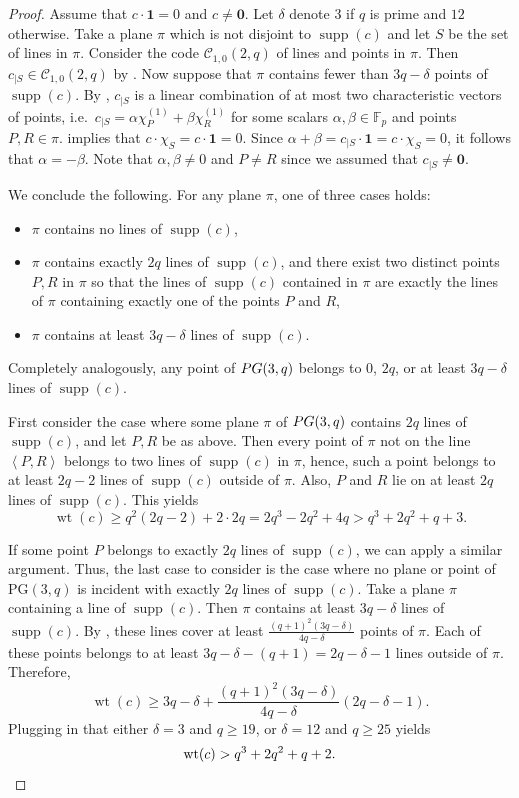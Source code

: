 \documentclass[a4paper]{article}
\theoremstyle{definition}
\newcommand{\FF}{\mathbb F}
\newcommand{\vspan}[1]{\left \langle #1 \right \rangle}
\newcommand{\pg}{\textnormal{PG}}
\newcommand{\one}{\mathbf 1}
\newcommand{\zero}{\mathbf 0}
\newcommand{\mc}{\mathcal C}
\DeclareMathOperator{\supp}{supp}
\DeclareMathOperator{\wt}{wt}
\begin{document}
\begin{proof}
 Assume that $c \cdot \one = 0$ and $c \neq \zero$.
 Let $\delta$ denote $3$ if $q$ is prime and $12$ otherwise.
 Take a plane $\pi$ which is not disjoint to $\supp(c)$ and let $S$ be the set of lines in $\pi$.
 Consider the code $\mc_{1,0}(2,q)$ of lines and points in $\pi$.
 Then $c_{|S} \in \mc_{1,0}(2,q)$ by .
 Now suppose that $\pi$ contains fewer than $3q-\delta$ points of $\supp(c)$.
 By , $c_{|S}$ is a linear combination of at most two characteristic vectors of points, i.e.\ $c_{|S} = \alpha \chi_{P}^{(1)} + \beta \chi_{R}^{(1)}$ for some scalars $\alpha, \beta \in \FF_p$ and points $P, R \in \pi$.
  implies that $c \cdot \chi_S = c \cdot \one = 0$.
 Since $\alpha + \beta = c_{|S} \cdot \one = c \cdot \chi_S = 0$, it follows that $\alpha = -\beta$.
 Note that $\alpha, \beta \neq 0$ and $P \neq R$ since we assumed that $c_{|S} \neq \zero$.
 
 We conclude the following.
 For any plane $\pi$, one of three cases holds:
 \begin{itemize}
  \item $\pi$ contains no lines of $\supp(c)$,
  \item $\pi$ contains exactly $2q$ lines of $\supp(c)$, and there exist two distinct points $P, R$ in $\pi$ so that the lines of $\supp(c)$ contained in $\pi$ are exactly the lines of $\pi$ containing exactly one of the points $P$ and $R$,
  \item $\pi$ contains at least $3q-\delta$ lines of $\supp(c)$.
 \end{itemize}

 Completely analogously, any point of $\pg(3,q)$ belongs to 0, $2q$, or at least $3q-\delta$ lines of $\supp(c)$.

 First consider the case where some plane $\pi$ of $\pg(3,q)$ contains $2q$ lines of $\supp(c)$, and let $P, R$ be as above.
 Then every point of $\pi$ not on the line $\vspan{P,R}$ belongs to two lines of $\supp(c)$ in $\pi$, hence, such a point belongs to at least $2q-2$ lines of $\supp(c)$ outside of $\pi$.
 Also, $P$ and $R$ lie on at least $2q$ lines of $\supp(c)$.
 This yields
 \[
  \wt(c) \geq q^2 (2q-2) + 2\cdot2q =2q^3-2q^2+4q > q^3 + 2q^2 + q + 3.
 \]

 If some point $P$ belongs to exactly $2q$ lines of $\supp(c)$, we can apply a similar argument.
 Thus, the last case to consider is the case where no plane or point of PG$(3,q)$ is incident with exactly $2q$ lines of $\supp(c)$.
 Take a plane $\pi$ containing a line of $\supp(c)$.
 Then $\pi$ contains at least $3q-\delta$ lines of $\supp(c)$.
 By , these lines cover at least $\frac{(q+1)^2(3q-\delta)}{4q-\delta}$ points of $\pi$.
 Each of these points belongs to at least $3q-\delta - (q+1) = 2q - \delta - 1$ lines outside of $\pi$.
 Therefore,
 \[
  \wt(c) \geq 3q-\delta + \frac{(q+1)^2(3q-\delta)}{4q-\delta} (2q-\delta-1).
 \]
 Plugging in that either $\delta = 3$ and $q \geq 19$, or $\delta = 12$ and $q \geq 25$ yields
 \[
  \wt(c) > q^3 + 2q^2 + q + 2. \qedhere 
 \]
\end{proof}
\end{document}
